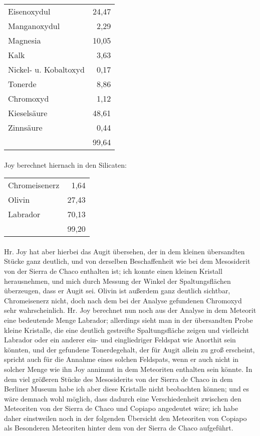 \documentclass[a4paper, 11pt, oneside]{article}
\begin{document}
\begin{center}
\begin{tabular}{ l r }
    Eisenoxydul & 24,47\\
    Manganoxydul & 2,29\\
    Magnesia & 10,05\\
    Kalk & 3,63\\
    Nickel- u. Kobaltoxyd & 0,17\\
    Tonerde & 8,86\\
    Chromoxyd & 1,12\\
    Kieselsäure & 48,61\\
    Zinnsäure & 0,44\\
     & 99,64\\
\end{tabular}
\end{center}
\paragraph{}
Joy berechnet hiernach in den Silicaten:
\begin{center}
\begin{tabular}{ l r }
    Chromeisenerz & 1,64\\
    Olivin & 27,43\\
    Labrador & 70,13\\
     & 99,20\\
\end{tabular}
\end{center}
\paragraph{}
Hr. Joy hat aber hierbei das Augit übersehen, der in dem kleinen übersandten Stücke ganz deutlich, und von derselben Beschaffenheit wie bei dem Mesosiderit von der Sierra de Chaco enthalten ist; ich konnte einen kleinen Kristall herausnehmen, und mich durch Messung der Winkel der Spaltungsflächen überzeugen, dass er Augit sei. Olivin ist außerdem ganz deutlich sichtbar, Chromeisenerz nicht, doch nach dem bei der Analyse gefundenen Chromoxyd sehr wahrscheinlich. Hr. Joy berechnet nun noch aus der Analyse in dem Meteorit eine bedeutende Menge Labrador; allerdings sieht man in der übersandten Probe kleine Kristalle, die eine deutlich gestreifte Spaltungsfläche zeigen und vielleicht Labrador oder ein anderer ein- und eingliedriger Feldspat wie Anorthit sein könnten, und der gefundene Tonerdegehalt, der für Augit allein zu groß erscheint, spricht auch für die Annahme eines solchen Feldspats, wenn er auch nicht in solcher Menge wie ihn Joy annimmt in dem Meteoriten enthalten sein könnte. In dem viel größeren Stücke des Mesosiderits von der Sierra de Chaco in dem Berliner Museum habe ich aber diese Kristalle nicht beobachten können; und es wäre demnach wohl möglich, dass dadurch eine Verschiedenheit zwischen den Meteoriten von der Sierra de Chaco und Copiapo angedeutet wäre; ich habe daher einstweilen noch in der folgenden Übersicht den Meteoriten von Copiapo als Besonderen Meteoriten hinter dem von der Sierra de Chaco aufgeführt.
\end{document}
